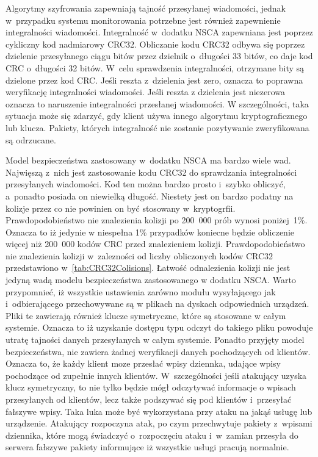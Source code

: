 Algorytmy szyfrowania zapewniają tajność przesyłanej wiadomości,
jednak w~przypadku systemu monitorowania potrzebne jest również
zapewnienie integralności wiadomości. Integralność w~dodatku NSCA
zapewniana jest poprzez cykliczny kod nadmiarowy CRC32. Obliczanie
kodu CRC32 odbywa się poprzez dzielenie przesyłanego ciągu bitów przez
dzielnik o~długości 33 bitów, co daje kod CRC o~długości 32
bitów. W~celu sprawdzenia integralności, otrzymane bity są dzielone
przez kod CRC. Jeśli reszta z~dzielenia jest zero, oznacza to poprawna
weryfikację integralności wiadomości. Jeśli reszta z dzielenia jest
niezerowa oznacza to naruszenie integralności przesłanej wiadomości. W
szczególności, taka sytuacja może się zdarzyć, gdy klient używa innego
algorytmu kryptograficznego lub klucza. Pakiety, których integralność
nie zostanie pozytywanie zweryfikowana są odrzucane.

Model bezpieczeństwa zastosowany w~dodatku NSCA ma bardzo wiele wad. Najwięszą
z~nich jest zastosowanie kodu CRC32 do sprawdzania integralności
przesyłanych wiadomości. Kod ten można bardzo prosto i~szybko
obliczyć, a~ponadto posiada on niewielką długość. Niestety jest on
bardzo podatny na kolizje przez co nie powinien on być stosowany
w~kryptogrfii. Prawdopodobieństwo nie znalezienia kolizji po 200~000
prób wynosi poniżej~1\%. Oznacza to iż jedynie w niespełna 1\%
przypadków koniecne będzie obliczenie więcej niż 200~000 kodów CRC
przed znalezieniem kolizji. Prawdopodobieństwo nie znalezienia kolizji
w~zalezności od liczby obliczonych kodów CRC32 przedstawiono
w~\ref{tab:CRC32Colisions}. Łatwość odnalezienia kolizji nie jest
jedyną wadą modelu bezpieczeństwa zastosowanego w dodatku NSCA. Warto
przypomnieć, iż wszystkie ustawienia zarówno modułu wysyłającego jak
i~odbierającego przechowywane są w plikach na dyskach odpowiednich
urządzeń. Pliki te zawierają również klucze symetryczne, które są
stosowane w całym systemie. Oznacza to iż uzyskanie dostępu typu
odczyt do takiego pliku powoduje utratę tajności danych przesyłanych w
całym systemie. Ponadto przyjęty model bezpieczeństwa, nie zawiera
żadnej weryfikacji danych pochodzących od klientów. Oznacza to, że
każdy klient moze przesłać wpisy dziennka, udające wpisy pochodzące od
zupełnie innych klientów. W~szczególności jeśli atakujący uzyska klucz
symetryczny, to nie tylko będzie mógł odczytywać informacje o wpisach
przesyłanych od klientów, lecz także podszywać się pod klientów
i~przesyłać fałszywe wpisy. Taka luka może być wykorzystana przy ataku
na jakąś usługę lub urządzenie. Atakujący rozpoczyna atak, po czym przechwytuje
pakiety z~wpisami dziennika, które mogą świadczyć o~rozpoczęciu
ataku i~w~zamian przesyła do serwera fałszywe pakiety informujące iż
wszystkie usługi pracują normalnie.

